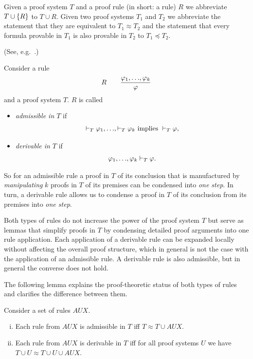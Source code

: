 \documentclass[manuscript, screen, review]{acmart}
\newcommand{\AUX}{\mathit{AUX}}
\begin{document}
Given a proof system $T$ and a proof rule (in short: a rule) $R$ we
abbreviate $T \cup \mbox{$\{{R}\}$}$ to $T \cup R$. Given two proof systems $T_1$
and $T_2$ we abbreviate the statement that they are equivalent to
$T_1 \approx T_2$ and the statement that every formula provable in
$T_1$ is also provable in $T_2$ to $T_1 \preceq T_2$.

\begin{definition}(See, e.g.~\cite[page 47]{Pla13}.)
  
  Consider a rule
  \[ 
  R \qquad \frac{\varphi_1,\mbox{$\ldots$},\varphi_k}{\varphi}
\]
and a proof system $T$. $R$ is called
\begin{itemize}
\item \emph{admissible in $T$} if 
\[
 \vdash_T \varphi_1, \mbox{$\ldots$}, \vdash_T \varphi_k
 \mbox{ implies }
 \vdash_T \varphi,
\]

\item \emph{derivable in $T$} if 
\[
 \varphi_1, \mbox{$\ldots$}, \varphi_k \vdash_T \varphi.
\]

\end{itemize}

\end{definition}

So for an admissible rule a proof in $T$ of its conclusion 
that is manufactured by \emph{manipulating} $k$ proofs in $T$ 
of its premises can be condensed into \emph{one step}. 
In turn, a derivable rule allows us to condense a proof in $T$ of
its conclusion from its premises into \emph{one step}.

Both types of rules do not increase the power of the proof system $T$
but serve as lemmas that simplify proofs in $T$ by condensing detailed
proof arguments into one rule application.  Each application of a
derivable rule can be expanded locally without affecting the overall
proof structure, which in general is not the case with the application
of an admissible rule.  A derivable rule is also admissible, but in
general the converse does not hold.

The following lemma explains the proof-theoretic status of both types
of rules and clarifies the difference between them.

\begin{lemma} \label{lem:AUX}
  Consider a set of rules $\AUX$.
  \begin{enumerate}[(i)]
  \item 
  Each rule from $\AUX$ is admissible in $T$ iff $T \approx T \cup \AUX$. 

\item Each rule from $\AUX$ is derivable in $T$ iff for all proof
  systems $U$ we have $T \cup U \approx T \cup U \cup \AUX$.

\end{enumerate}
\end{lemma}
\end{document}
